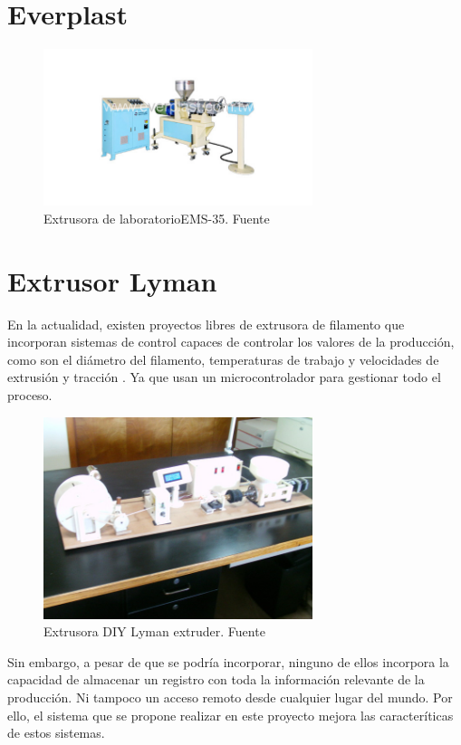 \section{Everplast}

\begin{figure}[H]
    \centering
    \includegraphics[width=0.7\textwidth]{images/everplast.jpg}
    \caption[Extrusora de laboratorio EMS-35]{Extrusora de laboratorioEMS-35. Fuente \cite{everplast}}
    \label{fig:everplast}
\end{figure}


\section{Extrusor Lyman}

En la actualidad, existen proyectos libres de extrusora de filamento que incorporan sistemas de control capaces de controlar los valores de la producción, como son el diámetro del filamento, temperaturas de trabajo y velocidades de extrusión y tracción \cite{lyman}. Ya que usan un microcontrolador para gestionar todo el proceso.\\


\begin{figure}[H]
    \centering
    \includegraphics[width=0.7\textwidth]{images/lyman.jpg}
    \caption[Extrusora DIY Lyman extruder]{Extrusora DIY Lyman extruder. Fuente \cite{lyman}}
    \label{fig:lyman}
\end{figure}


Sin embargo, a pesar de que se podría incorporar, ninguno de ellos incorpora la capacidad de almacenar un registro con toda la información relevante de la producción. Ni tampoco un acceso remoto desde cualquier lugar del mundo. Por ello, el sistema que se propone realizar en este proyecto mejora las caracteríticas de estos sistemas.
